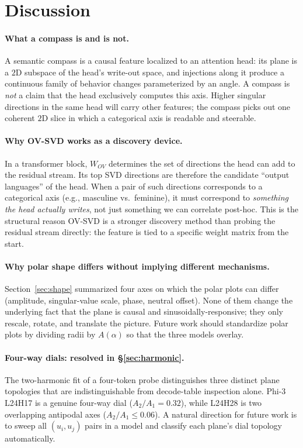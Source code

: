 \section{Discussion}
\label{sec:discussion}

\paragraph{What a compass is and is not.} A semantic compass is a causal
feature localized to an attention head: its plane is a $2$D subspace of
the head's write-out space, and injections along it produce a continuous
family of behavior changes parameterized by an angle. A compass is
\emph{not} a claim that the head exclusively computes this axis. Higher
singular directions in the same head will carry other features; the
compass picks out one coherent $2$D slice in which a categorical axis is
readable and steerable.

\paragraph{Why OV-SVD works as a discovery device.} In a transformer
block, $W_{OV}$ determines the set of directions the head can add to the
residual stream. Its top SVD directions are therefore the candidate
``output languages'' of the head. When a pair of such directions
corresponds to a categorical axis (e.g., masculine vs.\ feminine), it
must correspond to \emph{something the head actually writes}, not just
something we can correlate post-hoc. This is the structural reason
OV-SVD is a stronger discovery method than probing the residual stream
directly: the feature is tied to a specific weight matrix from the
start.

\paragraph{Why polar shape differs without implying different
mechanisms.} Section~\ref{sec:shape} summarized four axes on which the
polar plots can differ (amplitude, singular-value scale, phase, neutral
offset). None of them change the underlying fact that the plane is
causal and sinusoidally-responsive; they only rescale, rotate, and
translate the picture. Future work should standardize polar plots by
dividing radii by $A(\alpha)$ so that the three models overlay.

\paragraph{Four-way dials: resolved in \S\ref{sec:harmonic}.} The two-harmonic
fit of a four-token probe distinguishes three distinct plane topologies
that are indistinguishable from decode-table inspection alone. Phi-3
L24H17 is a genuine four-way dial ($A_2 / A_1 = 0.32$), while L24H28
is two overlapping antipodal axes ($A_2 / A_1 \leq 0.06$). A natural
direction for future work is to sweep all $(u_i, u_j)$ pairs in a
model and classify each plane's dial topology automatically.

